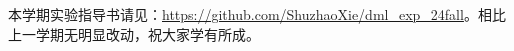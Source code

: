 

\hspace{2em} 本学期实验指导书请见：\url{https://github.com/ShuzhaoXie/dml_exp_24fall}。相比上一学期无明显改动，祝大家学有所成。

\vspace{5em}




